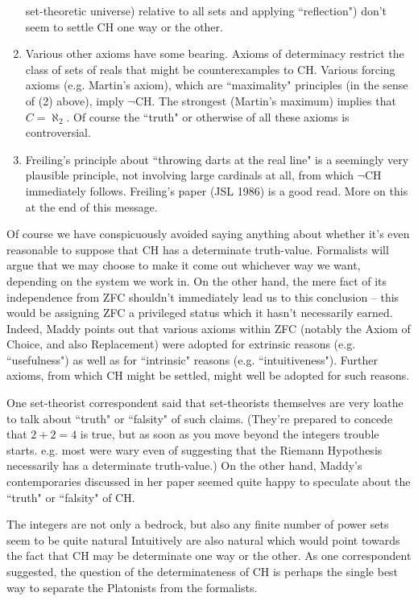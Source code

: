 \begin{enumerate}
    set-theoretic universe) relative to all sets and applying ``reflection")
    don't seem to settle CH one way or the other.
\item Various other axioms have some bearing.  Axioms of determinacy restrict
    the class of sets of reals that might be counterexamples to CH.  Various
    forcing axioms (e.g. Martin's axiom), which are ``maximality" principles
    (in the sense of (2) above), imply $\neg$CH.  The strongest (Martin's maximum)
    implies that $C = \aleph_2$.  Of course the ``truth" or otherwise of all
    these axioms is controversial.
\item Freiling's principle about ``throwing darts at the real line" is a
    seemingly very plausible principle, not involving large cardinals at
    all, from which $\neg$CH immediately follows.  Freiling's paper (JSL 1986)
    is a good read.  More on this at the end of this message.
\end{enumerate}

Of course we have conspicuously avoided saying anything about whether it's
even reasonable to suppose that CH has a determinate truth-value.
Formalists will argue that we may choose to make it come out whichever
way we want, depending on the system we work in.  On the other hand,
the mere fact of its independence from ZFC shouldn't immediately lead
us to this conclusion -- this would be assigning ZFC a privileged status
which it hasn't necessarily earned.  Indeed, Maddy points out that
various axioms within ZFC (notably the Axiom of Choice, and also
Replacement) were adopted for extrinsic reasons (e.g. ``usefulness")
as well as for ``intrinsic" reasons (e.g. ``intuitiveness").  Further
axioms, from which CH might be settled, might well be adopted for such
reasons.

One set-theorist correspondent said that set-theorists themselves are very
loathe to talk about ``truth" or ``falsity" of such claims.  (They're
prepared to concede that $2+2=4$ is true, but as soon as you move beyond
the integers trouble starts.  e.g. most were wary even of suggesting that
the Riemann Hypothesis necessarily has a determinate truth-value.)  On
the other hand, Maddy's contemporaries discussed in her paper seemed quite
happy to speculate about the ``truth" or ``falsity" of CH.

The integers are not only a bedrock, but also
any finite number of power sets seem to be quite natural
Intuitively are also natural which would point towards the fact
that  CH may be determinate
one way or the other.  As one correspondent suggested, the question of the
determinateness of CH is perhaps the single best way to separate the
Platonists from the formalists.


